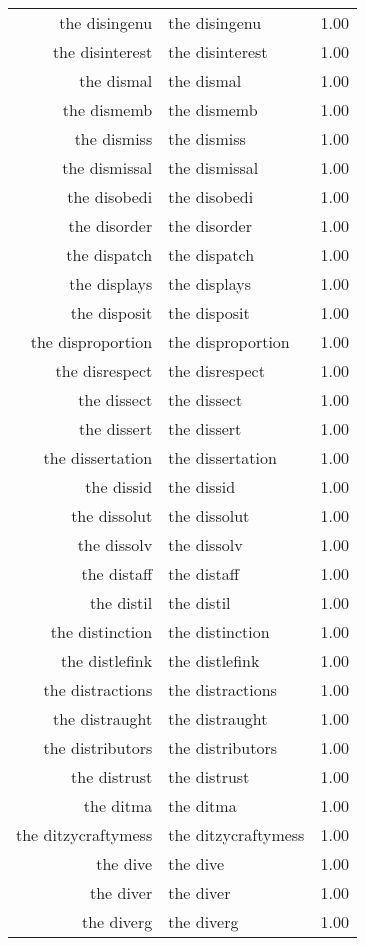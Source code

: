 \begin{table}[ht]
\begin{tabular}{rlr}
  the disingenu & the disingenu & 1.00 \\ 
  the disinterest & the disinterest & 1.00 \\ 
  the dismal & the dismal & 1.00 \\ 
  the dismemb & the dismemb & 1.00 \\ 
  the dismiss & the dismiss & 1.00 \\ 
  the dismissal & the dismissal & 1.00 \\ 
  the disobedi & the disobedi & 1.00 \\ 
  the disorder & the disorder & 1.00 \\ 
  the dispatch & the dispatch & 1.00 \\ 
  the displays & the displays & 1.00 \\ 
  the disposit & the disposit & 1.00 \\ 
  the disproportion & the disproportion & 1.00 \\ 
  the disrespect & the disrespect & 1.00 \\ 
  the dissect & the dissect & 1.00 \\ 
  the dissert & the dissert & 1.00 \\ 
  the dissertation & the dissertation & 1.00 \\ 
  the dissid & the dissid & 1.00 \\ 
  the dissolut & the dissolut & 1.00 \\ 
  the dissolv & the dissolv & 1.00 \\ 
  the distaff & the distaff & 1.00 \\ 
  the distil & the distil & 1.00 \\ 
  the distinction & the distinction & 1.00 \\ 
  the distlefink & the distlefink & 1.00 \\ 
  the distractions & the distractions & 1.00 \\ 
  the distraught & the distraught & 1.00 \\ 
  the distributors & the distributors & 1.00 \\ 
  the distrust & the distrust & 1.00 \\ 
  the ditma & the ditma & 1.00 \\ 
  the ditzycraftymess & the ditzycraftymess & 1.00 \\ 
  the dive & the dive & 1.00 \\ 
  the diver & the diver & 1.00 \\ 
  the diverg & the diverg & 1.00 \\ 

\end{tabular}
\end{table}

